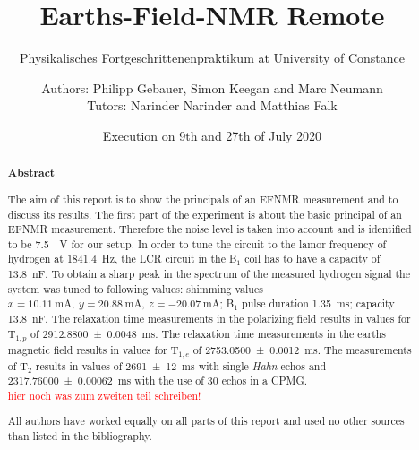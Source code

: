\title{Earths-Field-NMR Remote}
\subtitle{Physikalisches Fortgeschrittenenpraktikum at University of Constance}
\author{Authors: Philipp Gebauer, Simon Keegan and Marc Neumann \\ \large{Tutors: Narinder Narinder and Matthias Falk}}
\date{Execution on 9th and 27th of July 2020}
\maketitle
\begin{abstract}
    \begin{center}
        \Large{\textsf{\textbf{Abstract}}}
    \end{center}
    \vspace{0.75 cm}
    \begin{singlespace}
    \noindent The aim of this report is to show the principals of an EFNMR measurement and to discuss its results.\newline
    The first part of the experiment is about the basic principal of an EFNMR measurement.
    Therefore the noise level is taken into account and is identified to be \SI{7.5}{\mu \volt} for our setup.
    In order to tune the circuit to the lamor frequency of hydrogen at \SI{1841.4}{\hertz}, the LCR circuit in the B$_1$ coil has to have a capacity of \SI{13.8}{\nano \farad}.
    To obtain a sharp peak in the spectrum of the measured hydrogen signal the system was tuned to following values: shimming values $x = \SI{10.11}{\milli \ampere}, \ y = \SI{20.88}{\milli \ampere}, \ z = \SI{-20.07}{\milli \ampere}$; B$_1$ pulse duration \SI{1.35}{\milli \second}; capacity \SI{13.8}{\nano \farad}.
    The relaxation time measurements in the polarizing field results in values for T$_{1,p}$ of \SI{2912.8800 \pm 0.0048}{\milli \second}.
    The relaxation time measurements in the earths magnetic field results in values for T$_{1,e}$ of \SI{2753.0500 \pm 0.0012}{\milli \second}.
    The measurements of T$_2$ results in values of \SI{2691 \pm 12}{\milli \second} with single \textit{Hahn} echos and \SI{2317.76000 \pm 0.00062}{\milli \second} with the use of 30 echos in a CPMG.\\
    \vspace{0.75 cm}
    \textcolor{red}{hier noch was zum zweiten teil schreiben!} 


    \noindent All authors have worked equally on all parts of this report and used no other sources than listed in the bibliography.

\end{singlespace}
\end{abstract}

\thispagestyle{empty}
\newpage